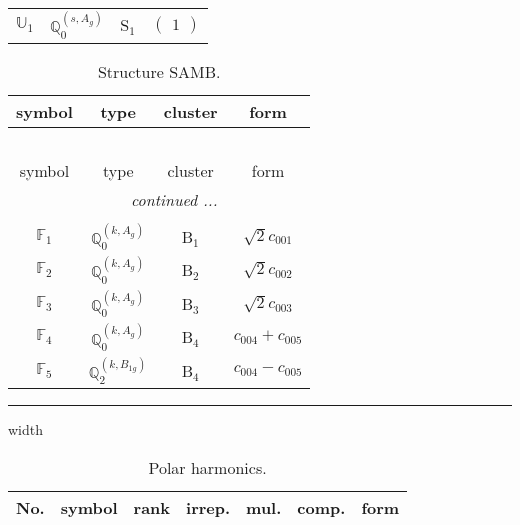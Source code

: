 \documentclass[fleqn,10pt,landscape]{article}
\begin{document}
\begin{itemize}
\begin{center}
\begin{longtable}{c|c|c|c}
$ \mathbb{U}_{1} $ & $\mathbb{Q}_{0}^{(s,A_{g})}$ & S$_{1}$ & $\begin{pmatrix} 1 \end{pmatrix}$ \\
\end{longtable}
\end{center}
\begin{center}
\renewcommand{\arraystretch}{1.3}
\begin{longtable}{c|c|c|c}
\caption{Structure SAMB.}
 \\
 \hline \hline
symbol & type & cluster & form \\ \hline \endfirsthead

\multicolumn{3}{l}{\tablename\ \thetable{}} \\
 \hline \hline
symbol & type & cluster & form \\ \hline \endhead

 \hline \hline
\multicolumn{3}{r}{\footnotesize\it continued ...} \\ \endfoot

 \hline \hline
\multicolumn{3}{r}{} \\ \endlastfoot

$ \mathbb{F}_{1} $ & $\mathbb{Q}_{0}^{(k,A_{g})}$ & B$_{1}$ & $\sqrt{2} c_{001}$ \\ \hline
$ \mathbb{F}_{2} $ & $\mathbb{Q}_{0}^{(k,A_{g})}$ & B$_{2}$ & $\sqrt{2} c_{002}$ \\ \hline
$ \mathbb{F}_{3} $ & $\mathbb{Q}_{0}^{(k,A_{g})}$ & B$_{3}$ & $\sqrt{2} c_{003}$ \\ \hline
$ \mathbb{F}_{4} $ & $\mathbb{Q}_{0}^{(k,A_{g})}$ & B$_{4}$ & $c_{004} + c_{005}$ \\
$ \mathbb{F}_{5} $ & $\mathbb{Q}_{2}^{(k,B_{1g})}$ & B$_{4}$ & $c_{004} - c_{005}$ \\
\end{longtable}
\end{center}

 \hfil \hrule height 1mm width \textwidth \hfil

\begin{center}
\renewcommand{\arraystretch}{1.3}
\begin{longtable}{ccccccc}
\caption{Polar harmonics.}
 \\
 \hline \hline
No. & symbol & rank & irrep. & mul. & comp. & form \\ \hline \endfirsthead


\end{longtable}
\end{center}
\end{itemize}
\end{document}
